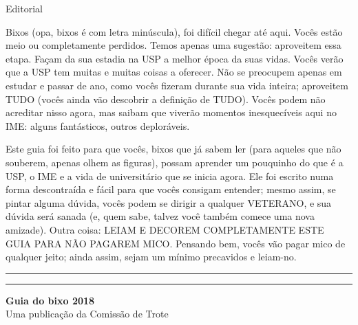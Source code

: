 \begin{editorial}{Editorial}

Bixos (opa, bixos é com letra minúscula), foi difícil chegar até aqui. Vocês
estão meio ou completamente perdidos. Temos apenas uma sugestão: aproveitem essa
etapa.  Façam da sua estadia na USP a melhor época da suas vidas. Vocês verão
que a USP tem muitas e muitas coisas a oferecer. Não se preocupem apenas em
estudar e passar de ano, como vocês fizeram durante sua vida inteira; aproveitem
TUDO (vocês ainda vão descobrir a definição de TUDO). Vocês podem não acreditar
nisso agora, mas saibam que viverão momentos inesquecíveis aqui no IME: alguns
fantásticos, outros deploráveis.

Este guia foi feito para que vocês, bixos que já sabem ler (para aqueles que não
souberem, apenas olhem as figuras), possam aprender um pouquinho do que é a USP,
o IME e a vida de universitário que se inicia agora. Ele foi escrito numa forma
descontraída e fácil para que vocês consigam entender; mesmo assim, se pintar
alguma dúvida, vocês podem se dirigir a qualquer VETERANO, e sua dúvida será
sanada (e, quem sabe, talvez você também comece uma nova amizade). Outra coisa:
LEIAM E DECOREM COMPLETAMENTE ESTE GUIA PARA NÃO PAGAREM MICO. Pensando bem,
vocês vão pagar mico de qualquer jeito; ainda assim, sejam um mínimo precavidos
e leiam-no.


\rule{\textwidth}{0.5ex}\rule{2ex}{0.5ex}

{\large\bf Guia do bixo 2018} \\
Uma publicação da Comissão de Trote


\end{editorial}
